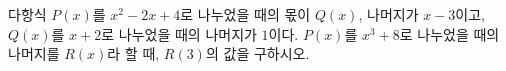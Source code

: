 다항식 $P(x)$를 $x^2-2x+4$로 나누었을 때의 몫이 $Q(x)$, 나머지가 $x-3$이고, $Q(x)$를 $x+2$로 나누었을 때의 나머지가 $1$이다. $P(x)$를 $x^3+8$로 나누었을 때의 나머지를 $R(x)$라 할 때, $R(3)$의 값을 구하시오.
